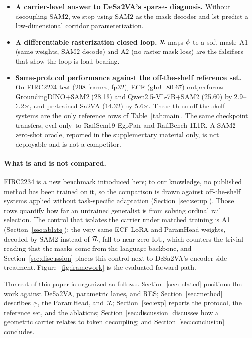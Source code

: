 \begin{itemize}
\item \textbf{A carrier-level answer to DeSa2VA's sparse-\Seg{} diagnosis.} Without decoupling SAM2, we stop using SAM2 as the mask decoder and let \Seg{} predict a low-dimensional corridor parameterization.
\item \textbf{A differentiable rasterization closed loop.} $\mathcal{R}$ maps $\phi$ to a soft mask; A1 (same weights, SAM2 decode) and A2 (no raster mask loss) are the falsifiers that show the loop is load-bearing.
\item \textbf{Same-protocol performance against the off-the-shelf reference set.} On FIRC2234 test (208 frames, fp32), ECF (gIoU 80.67) outperforms GroundingDINO+SAM2 (28.18) and Qwen2.5-VL-7B+SAM2 (25.60) by 2.9--3.2$\times$, and pretrained Sa2VA (14.32) by 5.6$\times$. These three off-the-shelf systems are the only reference rows of Table~\ref{tab:main}. The same checkpoint transfers, eval-only, to RailSem19-EgoPair and RailBench 1L1R. A SAM2 zero-shot oracle, reported in the supplementary material only, is not deployable and is not a competitor.
\end{itemize}

\paragraph{What is and is not compared.}
FIRC2234 is a new benchmark introduced here; to our knowledge, no published method has been trained on it, so the comparison is drawn against off-the-shelf systems applied without task-specific adaptation (Section~\ref{sec:setup}).
Those rows quantify how far an untrained generalist is from solving ordinal rail selection.
The control that isolates the carrier under matched training is A1 (Section~\ref{sec:ablate}): the very same ECF LoRA and ParamHead weights, decoded by SAM2 instead of $\mathcal{R}$, fall to near-zero IoU, which counters the trivial reading that the masks come from the language backbone, and Section~\ref{sec:discussion} places this control next to DeSa2VA's encoder-side treatment.
Figure~\ref{fig:framework} is the evaluated forward path.

The rest of this paper is organized as follows.
Section~\ref{sec:related} positions the work against DeSa2VA, parametric lanes, and RES;
Section~\ref{sec:method} describes $\phi$, the ParamHead, and $\mathcal{R}$;
Section~\ref{sec:exp} reports the protocol, the reference set, and the ablations;
Section~\ref{sec:discussion} discusses how a geometric carrier relates to token decoupling;
and Section~\ref{sec:conclusion} concludes.
